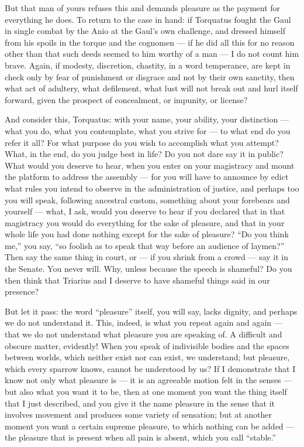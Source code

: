  But that man of yours refuses this and demands pleasure as the payment for everything he does. To return to the case in hand: if Torquatus fought the Gaul in single combat by the Anio at the Gaul's own challenge, and dressed himself from his spoils in the torque and the cognomen — if he did all this for no reason other than that such deeds seemed to him worthy of a man — I do not count him brave. Again, if modesty, discretion, chastity, in a word temperance, are kept in check only by fear of punishment or disgrace and not by their own sanctity, then what act of adultery, what defilement, what lust will not break out and hurl itself forward, given the prospect of concealment, or impunity, or license?

 And consider this, Torquatus: with your name, your ability, your distinction — what you do, what you contemplate, what you strive for — to what end do you refer it all? For what purpose do you wish to accomplish what you attempt? What, in the end, do you judge best in life? Do you not dare say it in public? What would you deserve to hear, when you enter on your magistracy and mount the platform to address the assembly — for you will have to announce by edict what rules you intend to observe in the administration of justice, and perhaps too you will speak, following ancestral custom, something about your forebears and yourself — what, I ask, would you deserve to hear if you declared that in that magistracy you would do everything for the sake of pleasure, and that in your whole life you had done nothing except for the sake of pleasure? ``Do you think me,'' you say, ``so foolish as to speak that way before an audience of laymen?'' Then say the same thing in court, or — if you shrink from a crowd — say it in the Senate. You never will. Why, unless because the speech is shameful? Do you then think that Triarius and I deserve to have shameful things said in our presence?

 But let it pass: the word ``pleasure'' itself, you will say, lacks dignity, and perhaps we do not understand it. This, indeed, is what you repeat again and again — that we do not understand what pleasure you are speaking of. A difficult and obscure matter, evidently! When you speak of indivisible bodies and the spaces between worlds, which neither exist nor can exist, we understand; but pleasure, which every sparrow knows, cannot be understood by us? If I demonstrate that I know not only what pleasure is — it is an agreeable motion felt in the senses — but also what you want it to be, then at one moment you want the thing itself that I just described, and you give it the name pleasure in the sense that it involves movement and produces some variety of sensation; but at another moment you want a certain supreme pleasure, to which nothing can be added — the pleasure that is present when all pain is absent, which you call ``stable.''

